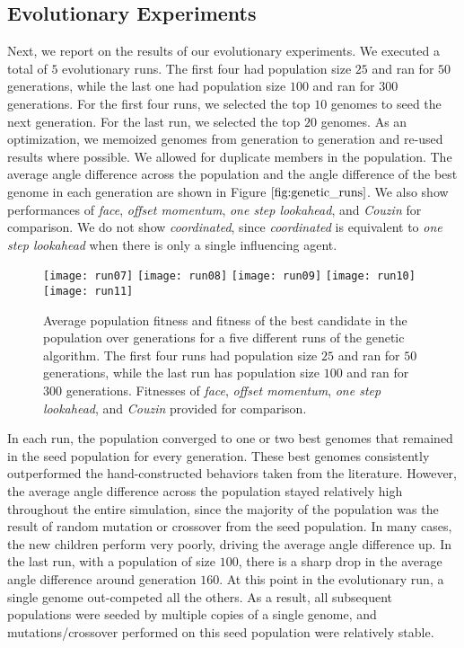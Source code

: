 \subsection{Evolutionary Experiments}
Next, we report on the results of our evolutionary experiments.
We executed a total of $5$ evolutionary runs.
The first four had population size $25$ and ran for $50$ generations, while the
last one had population size $100$ and ran for $300$ generations.
For the first four runs, we selected the top $10$ genomes to seed the next
generation.
For the last run, we selected the top $20$ genomes.
As an optimization, we memoized genomes from generation to generation and re-used
results where possible.
We allowed for duplicate members in the population.
The average angle difference across the population and the angle difference of
the best genome in each generation are shown in Figure $\ref{fig:genetic_runs}$.
We also show performances of \textit{face}, \textit{offset momentum},
\textit{one step lookahead}, and \textit{Couzin} for comparison.
We do not show \textit{coordinated}, since \textit{coordinated} is equivalent
to \textit{one step lookahead} when there is only a single influencing agent.
\begin{figure}
    \centering
    \texttt{[image: run07]}
    \texttt{[image: run08]}
    \texttt{[image: run09]}
    \texttt{[image: run10]}
    \texttt{[image: run11]}
    \caption{Average population fitness and fitness of the best candidate in the
    population over generations for a five different runs of the genetic algorithm.
    The first four runs had population size $25$ and ran for $50$ generations,
    while the last run has population size $100$ and ran for $300$ generations.
    Fitnesses of \textit{face}, \textit{offset momentum}, \textit{one step
    lookahead}, and \textit{Couzin} provided for comparison.}
    \label{fig:genetic_runs}
\end{figure}

In each run, the population converged to one or two best genomes that remained
in the seed population for every generation.
These best genomes consistently outperformed the hand-constructed behaviors
taken from the literature.
However, the average angle difference across the population stayed relatively
high throughout the entire simulation, since the majority of the population
was the result of random mutation or crossover from the seed population.
In many cases, the new children perform very poorly, driving the average angle
difference up.
In the last run, with a population of size $100$, there is a sharp drop in the
average angle difference around generation $160$.
At this point in the evolutionary run, a single genome out-competed all the
others.
As a result, all subsequent populations were seeded by multiple copies of a
single genome, and mutations/crossover performed on this seed population
were relatively stable.

